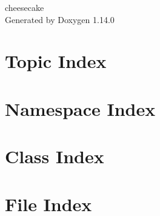 \documentclass[twoside]{book}
\newcommand{\+}{\discretionary{\mbox{\scriptsize$\hookleftarrow$}}{}{}}
\newcommand{\clearemptydoublepage}{%
    \newpage{\pagestyle{empty}\cleardoublepage}%
  }
\begin{document}
  \raggedbottom
    \hypersetup{pageanchor=false,
                bookmarksnumbered=true,
                pdfencoding=unicode
               }
  \begin{titlepage}
  \vspace*{7cm}
  \begin{center}%
  {\Large cheesecake}\\
  \vspace*{1cm}
  {\large Generated by Doxygen 1.14.0}\\
  \end{center}
  \end{titlepage}
  \clearemptydoublepage
  \tableofcontents
  \clearemptydoublepage
  \hypersetup{pageanchor=true}






\chapter{Topic Index}

\chapter{Namespace Index}

\chapter{Class Index}

\chapter{File Index}

\end{document}
